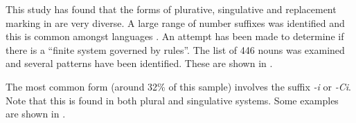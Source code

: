 \documentclass[output=paper]{langsci/langscibook}
\begin{document}
This study has found that the forms of plurative, singulative and replacement marking in  are very diverse. A large range of number suffixes was identified and this is common amongst  languages \citep[219]{Dimmendaal2000}. An attempt has been made to determine if there is a “finite system governed by rules”. The list of 446 nouns was examined and several patterns have been identified. These are shown in . 

\begin{table}
\caption{Patterns for singular and plural formation}
\label{tab:moodie:9}
\end{table}

The most common form (around 32\% of this sample) involves the suffix \textit{-i} or \textit{-Ci}. Note that this is found in both plural and singulative systems. Some examples are shown in .  
\end{document}
